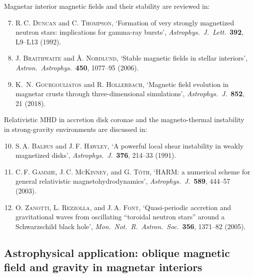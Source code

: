 \noindent Magnetar interior magnetic fields and their stability are
reviewed in:
\begin{enumerate}
\setcounter{enumi}{6}
\item R.\,C. \textsc{Duncan} and C. \textsc{Thompson},
  `Formation of very strongly magnetized neutron stars:
   implications for gamma-ray bursts',
  \emph{Astrophys.\ J.\ Lett.}\ \textbf{392}, L9--L13 (1992).

\item J. \textsc{Braithwaite} and \AA. \textsc{Nordlund},
  `Stable magnetic fields in stellar interiors',
  \emph{Astron.\ Astrophys.}\ \textbf{450}, 1077--95 (2006).

\item K.~N. \textsc{Gourgouliatos} and R. \textsc{Hollerbach},
  `Magnetic field evolution in magnetar crusts through
   three-dimensional simulations',
  \emph{Astrophys.\ J.}\ \textbf{852}, 21 (2018).
\end{enumerate}

\noindent Relativistic MHD in accretion disk coronae and the
magneto-thermal instability in strong-gravity environments are
discussed in:
\begin{enumerate}
\setcounter{enumi}{9}
\item S.\,A. \textsc{Balbus} and J.\,F. \textsc{Hawley},
  `A powerful local shear instability in weakly magnetized disks',
  \emph{Astrophys.\ J.}\ \textbf{376}, 214--33 (1991).

\item C.\,F. \textsc{Gammie}, J.\,C. \textsc{McKinney},
  and G. \textsc{T\'oth},
  `HARM: a numerical scheme for general relativistic
   magnetohydrodynamics',
  \emph{Astrophys.\ J.}\ \textbf{589}, 444--57 (2003).

\item O. \textsc{Zanotti}, L. \textsc{Rezzolla},
  and J.\,A. \textsc{Font},
  `Quasi-periodic accretion and gravitational waves from
   oscillating ``toroidal neutron stars'' around a
   Schwarzschild black hole',
  \emph{Mon.\ Not.\ R.\ Astron.\ Soc.}\ \textbf{356}, 1371--82 (2005).
\end{enumerate}

\subsection*{Astrophysical application: oblique magnetic field and
  gravity in magnetar interiors}

